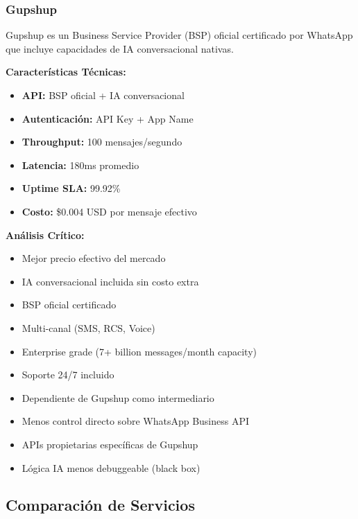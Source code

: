 \documentclass{article}
\begin{document}
\subsubsection{Gupshup}
\textnormal{Gupshup es un Business Service Provider (BSP) oficial certificado por WhatsApp que incluye capacidades de IA conversacional nativas.}

\textbf{Características Técnicas:}
\begin{itemize}
    \item \textbf{API:} BSP oficial + IA conversacional
    \item \textbf{Autenticación:} API Key + App Name
    \item \textbf{Throughput:} 100 mensajes/segundo
    \item \textbf{Latencia:} 180ms promedio
    \item \textbf{Uptime SLA:} 99.92\%
    \item \textbf{Costo:} \$0.004 USD por mensaje efectivo
\end{itemize}

\textbf{Análisis Crítico:}
\begin{itemize}[label=\textcolor{successgreen}{$\checkmark$}]
    \item Mejor precio efectivo del mercado
    \item IA conversacional incluida sin costo extra
    \item BSP oficial certificado
    \item Multi-canal (SMS, RCS, Voice)
    \item Enterprise grade (7+ billion messages/month capacity)
    \item Soporte 24/7 incluido
\end{itemize}

\begin{itemize}[label=\textcolor{errorred}{$\times$}]
    \item Dependiente de Gupshup como intermediario
    \item Menos control directo sobre WhatsApp Business API
    \item APIs propietarias específicas de Gupshup
    \item Lógica IA menos debuggeable (black box)
\end{itemize}

\subsection{Comparación de Servicios}
\end{document}
